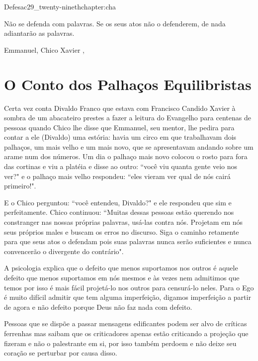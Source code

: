 \begin{chapterpage}{Defesa}{c29_twenty-ninethchapter:cha}

\begin{myquotation}Não se defenda com palavras. Se os seus atos não o defenderem, de nada adiantarão as palavras.

\par\vspace*{15mm}
\mbox{}\hfill \emdash{}Emmanuel, Chico Xavier 
, %
\par\end{myquotation}

\end{chapterpage}



\section{O Conto dos Palhaços Equilibristas}\label{c1_basicformatting:sec}

\emdash{}Certa vez conta Divaldo Franco que estava com Francisco Candido Xavier à sombra de um abacateiro prestes a fazer a leitura do Evangelho para centenas de pessoas quando Chico lhe disse que Emmanuel, seu mentor, lhe pedira para contar a ele (Divaldo) uma estória: havia um circo em que trabalhavam dois palhaços, um mais velho e um mais novo, que se apresentavam andando sobre um arame num dos números. Um dia o palhaço mais novo colocou o rosto para fora das cortinas e viu a platéia e disse ao outro: ``você viu quanta gente veio nos ver?" e o palhaço mais velho respondeu: ``eles vieram ver qual de nós cairá primeiro!".

\emdash{}E o Chico perguntou: ``você entendeu, Divaldo?" e ele respondeu que sim e perfeitamente. Chico continuou: ``Muitas dessas pessoas estão querendo nos constranger nas nossas próprias palavras, usá-las contra nós. Projetam em nós seus próprios males e buscam os erros no discurso. Siga o caminho retamente para que seus atos o defendam pois suas palavras nunca serão suficientes e nunca convencerão o divergente do contrário".

\emdash{}A psicologia explica que o defeito que menos suportamos nos outros é aquele defeito que menos suportamos em nós mesmos e às vezes nem admitimos que temos por isso é mais fácil projetá-lo nos outros para censurá-lo neles. Para o Ego é muito difícil admitir que tem alguma imperfeição, digamos imperfeição a partir de agora e não defeito porque Deus não faz nada com defeito.

\emdash{}Pessoas que se dispõe a passar mensagens edificantes podem ser alvo de críticas ferrenhas mas saibam que os criticadores apenas estão criticando a projeção que fizeram e não o palestrante em si, por isso também perdoem e não deixe seu coração se perturbar por causa disso.